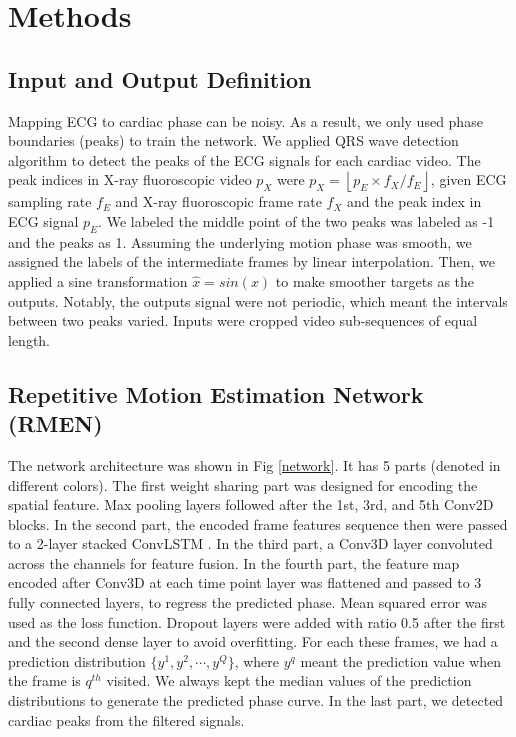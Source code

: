 \documentclass{article}
\begin{document}

\section{Methods}
\subsection{Input and Output Definition}
Mapping ECG to cardiac phase can be noisy. As a result, we only used phase boundaries (peaks) to train the network. We applied QRS wave detection algorithm \cite{ecgtool} to detect the peaks of the ECG signals for each cardiac video. The peak indices in X-ray fluoroscopic video $p_{X}$ were $p_{X} = \left\lfloor p_{E}\times f_{X}/{f_{E}}\right\rfloor$, given ECG sampling rate $f_{E}$ and X-ray fluoroscopic frame rate $f_{X}$ and the peak index in ECG signal $p_{E}$. We labeled the middle point of the two peaks was labeled as -1 and the peaks as 1. Assuming the underlying motion phase was smooth, we assigned the labels of the intermediate frames by linear interpolation. Then, we applied a sine transformation $\hat{x} = sin(x)$ to make smoother targets \cite{hinton2015distilling} as the outputs. Notably, the outputs signal were not periodic, which meant the intervals between two peaks varied. Inputs were cropped video sub-sequences of equal length.

\subsection{Repetitive Motion Estimation Network (RMEN) }
\label{netmethod}
The network architecture was shown in Fig \ref{network}. It has 5 parts (denoted in different colors).   The first weight sharing part was designed for encoding the spatial feature. Max pooling layers followed after the 1st, 3rd, and 5th Conv2D blocks. In the second part, the encoded frame features sequence then were passed to a 2-layer stacked ConvLSTM \cite{xingjian2015convolutional}. In the third part, a Conv3D layer convoluted across the channels for feature fusion. In the fourth part, the feature map encoded after Conv3D at each time point layer was flattened and passed to 3 fully connected layers, to regress the predicted phase. Mean squared error was used as the loss function. Dropout layers were added with ratio 0.5 after the first and the second dense layer to avoid overfitting. For each these frames, we had a prediction distribution $\{y^1,y^2,\cdots,y^Q\}$, where $y^q$ meant the prediction value when the frame is $q^{th}$ visited. We always kept the median values of the prediction distributions to generate the predicted phase curve. In the last part, we detected cardiac peaks from the filtered signals.
\end{document}
